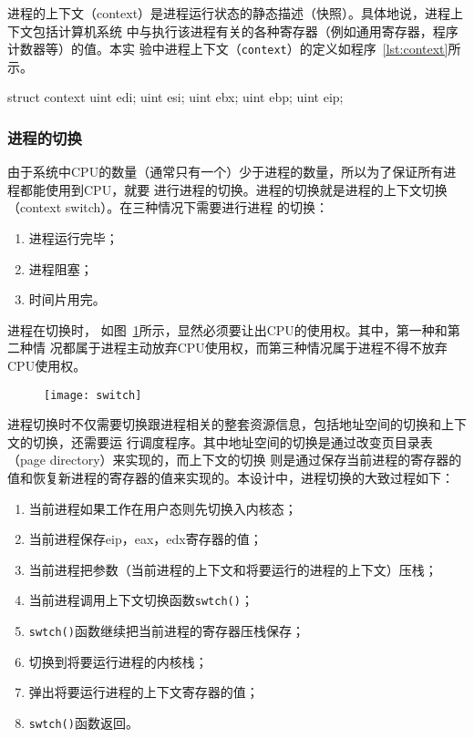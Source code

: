 \documentclass{swfcthesismscctex}
\begin{document}
进程的上下文（context）是进程运行状态的静态描述（快照）。具体地说，进程上下文包括计算机系统
中与执行该进程有关的各种寄存器（例如通用寄存器，程序计数器等）的值\cite{Sibasankar2010}。本实
验中进程上下文（\texttt{context}）的定义如程序~\ref{lst:context}所示。
\begin{listing}%
  \begin{codeblock}[.5]
    \begin{ccode}
struct context {
  uint edi;
  uint esi;
  uint ebx;
  uint ebp;
  uint eip;
}
\end{ccode}
  \end{codeblock}
  \label{lst:context}
\end{listing}

\subsubsection{进程的切换}

由于系统中CPU的数量（通常只有一个）少于进程的数量，所以为了保证所有进程都能使用到CPU，就要
进行进程的切换。进程的切换就是进程的上下文切换（context switch）。在三种情况下需要进行进程
的切换\cite{silberschatz11essentials}：
\begin{enumerate}
\item 进程运行完毕；
\item 进程阻塞；
\item 时间片用完。
\end{enumerate}

进程在切换时， 如图~\ref{fig:switch}所示，显然必须要让出CPU的使用权。其中，第一种和第二种情
况都属于进程主动放弃CPU使用权，而第三种情况属于进程不得不放弃CPU使用权。

\begin{figure}[h]
  \centering
  \texttt{[image: switch]}
  \label{fig:switch}
\end{figure}

进程切换时不仅需要切换跟进程相关的整套资源信息，包括地址空间的切换和上下文的切换，还需要运
行调度程序。其中地址空间的切换是通过改变页目录表（page directory）来实现的，而上下文的切换
则是通过保存当前进程的寄存器的值和恢复新进程的寄存器的值来实现的。本设计中，进程切换的大致过程如下：
\begin{enumerate}
\item 当前进程如果工作在用户态则先切换入内核态；
\item 当前进程保存eip，eax，edx寄存器的值；
\item 当前进程把参数（当前进程的上下文和将要运行的进程的上下文）压栈；
\item 当前进程调用上下文切换函数\texttt{swtch()}；
\item \texttt{swtch()}函数继续把当前进程的寄存器压栈保存；
\item 切换到将要运行进程的内核栈；
\item 弹出将要运行进程的上下文寄存器的值；
\item \texttt{swtch()}函数返回。
\end{enumerate}
\end{document}
